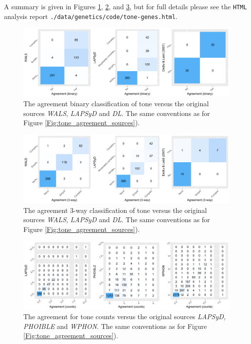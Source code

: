 \documentclass[twoside,onecolumn]{article}
\begin{document}
A summary is given in Figures \ref{Fig:tone_agreement_with_sources_binary},  \ref{Fig:tone_agreement_with_sources_3way}, and  \ref{Fig:tone_agreement_with_sources_counts}, but for full details please see the \texttt{HTML} analysis report \verb|./data/genetics/code/tone-genes.html|.

\begin{figure}[h]
  \centering
  \includegraphics[width=\textwidth]{../../code/figures/tone_agreement_with_sources_binary}
  \caption{The agreement binary classification of tone versus the original sources \textit{WALS}, \textit{LAPSyD} and \textit{DL}. The same conventions as for Figure \ref{Fig:tone_agreement_sources}).}
  \label{Fig:tone_agreement_with_sources_binary}
\end{figure}

\begin{figure}[h]
  \centering
  \includegraphics[width=\textwidth]{../../code/figures/tone_agreement_with_sources_3way}
  \caption{The agreement 3-way classification of tone versus the original sources \textit{WALS}, \textit{LAPSyD} and \textit{DL}. The same conventions as for Figure \ref{Fig:tone_agreement_sources}).}
  \label{Fig:tone_agreement_with_sources_3way}
\end{figure}

\begin{figure}[h]
  \centering
  \includegraphics[width=\textwidth]{../../code/figures/tone_agreement_with_sources_counts}
  \caption{The agreement for tone counts versus the original sources \textit{LAPSyD}, \textit{PHOIBLE} and \textit{WPHON}. The same conventions as for Figure \ref{Fig:tone_agreement_sources}).}
  \label{Fig:tone_agreement_with_sources_counts}
\end{figure}
\end{document}
